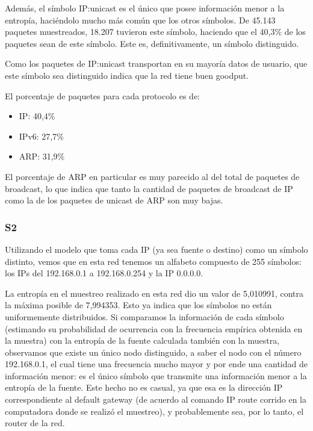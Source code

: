 Además, el símbolo IP:unicast es el único que posee información menor a la
entropía, haciéndolo mucho más común que los otros símbolos. De 45.143 paquetes
muestreados, 18.207 tuvieron este símbolo, haciendo que el 40,3\% de los paquetes
sean de este símbolo. Este es, definitivamente, un símbolo distinguido.

Como los paquetes de IP:unicast transportan en su mayoría datos de usuario,
que este símbolo sea distinguido indica que la red tiene buen goodput.


El porcentaje de paquetes para cada protocolo es de:
\begin{itemize}
	\item IP: 40,4\%
	\item IPv6: 27,7\%
	\item ARP: 31,9\%
\end{itemize}

El porcentaje de ARP en particular es muy parecido al del total de paquetes de
broadcast, lo que indica que tanto la cantidad de paquetes de broadcast de IP
como la de los paquetes de unicast de ARP son muy bajas.



\subsubsection{S2}

Utilizando el modelo que toma cada IP (ya sea fuente o destino) como
un símbolo distinto, vemos que en esta red tenemos un alfabeto
compuesto de 255 símbolos: los IPs del 192.168.0.1 a 192.168.0.254 y
la IP 0.0.0.0.

La entropía en el muestreo realizado en esta red dio un valor de
5,010991, contra la máxima posible de 7,994353. Esto ya indica
que los símbolos no están uniformemente distribuidos.
Si comparamos la información de cada símbolo (estimando su
probabilidad de ocurrencia con la frecuencia empírica obtenida en la
muestra) con la entropía de la fuente calculada también con la
muestra, observamos que existe un único nodo distinguido, a saber el
nodo con el número 192.168.0.1, el cual tiene una frecuencia mucho
mayor y por ende una cantidad de información menor: es el único
símbolo que transmite una información menor a la entropía de la
fuente. Este hecho no es casual, ya que esa es la dirección IP correspondiente al
default gateway (de acuerdo al comando IP route corrido en la
computadora donde se realizó el muestreo), y probablemente sea, por lo
tanto, el router de la red.


